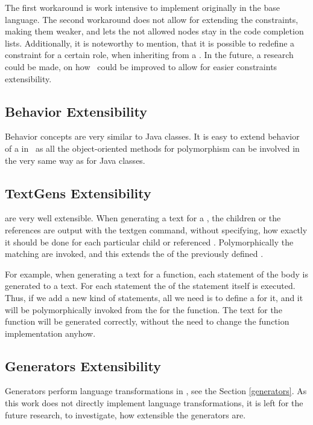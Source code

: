 The first workaround is work intensive to implement originally in the base language. The second workaround does not allow for extending the 
constraints, making them weaker, and lets the not allowed nodes stay in the code completion lists. Additionally, it is noteworthy to mention, that it is possible to redefine a constraint for a certain role, when inheriting 
from a . In the future, a research could be made, on how \jbmps\ could be improved to allow for easier constraints extensibility.

\subsection{Behavior Extensibility}

Behavior concepts are very similar to Java classes. It is easy to extend behavior of a  in \jbmps\
as all the object-oriented methods for polymorphism can be involved in the very same way as for Java classes.

\subsection{TextGens Extensibility}

 are very well extensible. When generating a text for a , the children or the references are output with 
the textgen \mpsid{append} command, without specifying, how exactly it should be done for each particular child or referenced . 
Polymorphically the  matching \rgp{textgen} are invoked, and this extends the \rg{textgen} of the previously defined \rg{concept}.

For example, when generating a text for a function, each statement of the body is generated to a text. 
For each statement the  of the statement itself is executed. Thus, if we add a new kind of statements,
all we need is to define a  for it, and it will be polymorphically invoked from the  for the
function. The text for the function will be generated correctly, without the need to change the function \rg{textgen}
implementation anyhow.

\subsection{Generators Extensibility}

Generators perform language transformations in \jbmps, see the Section \ref{generators}. As this work does not directly 
implement language transformations, it is left for the future research, to investigate, how extensible the 
generators are. 

